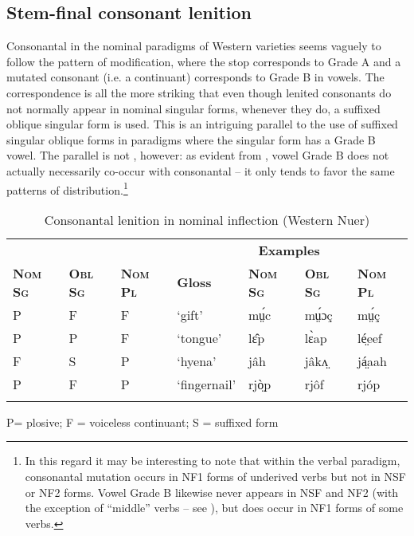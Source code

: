 \documentclass[output=paper,newtxmath,modfonts,nonflat,draftmode]{langsci/langscibook}
\begin{document}
\subsection{Stem-final consonant lenition}

Consonantal  in the nominal paradigms of Western  varieties seems vaguely to follow the pattern of  modification, where the stop corresponds to Grade A and a mutated consonant (i.e. a continuant) corresponds to Grade B in vowels. The correspondence is all the more striking that even though lenited consonants do not normally appear in nominal singular forms, whenever they do, a suffixed oblique singular form is used. This is an intriguing parallel to the use of suffixed singular oblique forms in paradigms where the  singular form has a Grade B vowel. The parallel is not , however: as evident from , vowel Grade B does not actually necessarily co-occur with consonantal  – it only tends to favor the same patterns of distribution.\footnote{In\label{fn:monich:17} this regard it may be interesting to note that within the verbal paradigm, consonantal mutation occurs in NF1 forms of underived verbs but not in NSF or NF2 forms. Vowel Grade B likewise never appears in NSF and NF2 (with the exception of “middle” verbs – see ), but does occur in NF1 forms of some verbs.}

\begin{table}
\begin{tabularx}{\textwidth}{lllXlll}
\lsptoprule

 & & & \multicolumn{4}{c}{\bfseries Examples}\\
\cmidrule{4-7}
\bfseries\scshape Nom Sg & \bfseries\scshape Obl Sg & \bfseries\scshape Nom Pl &  \bfseries Gloss & \bfseries\scshape Nom Sg & \bfseries\scshape Obl Sg & \bfseries\scshape Nom Pl\\
\midrule
P & F & F & ‘gift’ & mṳ́c & mṳ́ɔç & mṳ́ç\\
P & P & F & ‘tongue’ & lɛ̂p & lɛ̀ap & lé̤eef\\
F & S & P & ‘hyena’ & jâh & jâkʌ̤ & já̤aah\\
P & F & P & ‘fingernail’ & rjò̤p & rjôf & rjóp\\
\lspbottomrule
\end{tabularx}
\parbox{\textwidth}{\small\raggedright P= plosive; F = voiceless continuant; S = suffixed form}
\caption{Consonantal lenition in nominal inflection (Western Nuer)}
\label{tab:monich:21}
\end{table}
\end{document}
